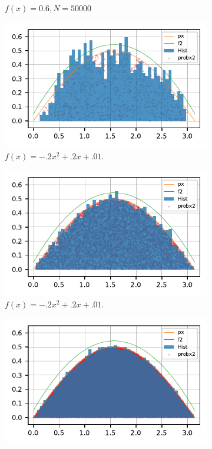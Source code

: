 \begin{figure}
\begin{subfigure}[b]{0.3\textwidth}
    \caption{$f(x)=0.6, N=50000$}
    \label{subfig:consN50000}
  \end{subfigure}
  \begin{subfigure}[b]{0.3\textwidth}
    \includegraphics[scale=.66]{CodeAndFigures/AcceptanceRejectionPlotf2N1000.pdf}
    \caption{$f(x)=-.2x^2+.2x+.01$.}
    \label{subfig:QuadN1000}
  \end{subfigure}
    \begin{subfigure}[b]{0.3\textwidth}
    \includegraphics[scale=.66]{CodeAndFigures/AcceptanceRejectionPlotf2N10000.pdf}
    \caption{$f(x)=-.2x^2+.2x+.01$.}
    \label{subfig:QuadN10000}
  \end{subfigure}
    \begin{subfigure}[b]{0.3\textwidth}
    \includegraphics[scale=.66]{CodeAndFigures/AcceptanceRejectionPlotf2N50000.pdf}

\end{subfigure}
\end{figure}
